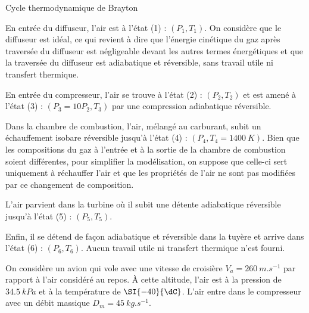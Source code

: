 \begin{exo}[PC][1][devoir]{Cycle thermodynamique de Brayton}
\begin{liste}


\item En entrée du diffuseur, l’air est à l’état (1) : $(P_1, T_1)$. On considère que le diffuseur est idéal, ce qui
revient à dire que l’énergie cinétique du gaz après traversée du diffuseur est négligeable devant les
autres termes énergétiques et que la traversée du diffuseur est adiabatique et réversible, sans travail utile ni transfert thermique.
\item En entrée du
compresseur, l’air se trouve à l’état (2) : $(P_2, T_2)$ et est amené à l’état (3) : $(P_3 = 10P_2, T_3)$ par une
compression adiabatique réversible.
\item Dans la chambre de combustion, l’air, mélangé au carburant, subit un échauffement isobare
réversible jusqu’à l’état (4) : $(P_4, T_4 = \SI{1 400}{K})$. Bien que les compositions du gaz à l’entrée et à la
sortie de la chambre de combustion soient différentes, pour simplifier la modélisation, on suppose
que celle-ci sert uniquement à réchauffer l’air et que les propriétés de l’air ne sont pas modifiées par
ce changement de composition. 
\item L’air parvient dans la turbine où il subit une détente adiabatique réversible jusqu’à l’état (5) :
$(P_5, T_5)$.
\item Enfin, il se détend de façon adiabatique et réversible dans la tuyère et arrive dans l’état (6) :
$(P_6,T_6)$. Aucun travail utile ni transfert thermique n'est fourni.
\end{liste}


On considère un avion qui vole avec une vitesse de croisière $V_a = \SI{260 }{m.s^{-1}}$ par rapport à l’air
considéré au repos. À cette altitude, l’air est à la pression de $\SI{34.5}{kPa}$ et à la température de $\SI{-40}{\dC}$.
L’air entre dans le compresseur avec un débit massique $D_m = \SI{45}{kg.s^{-1}}$.



\end{exo}
